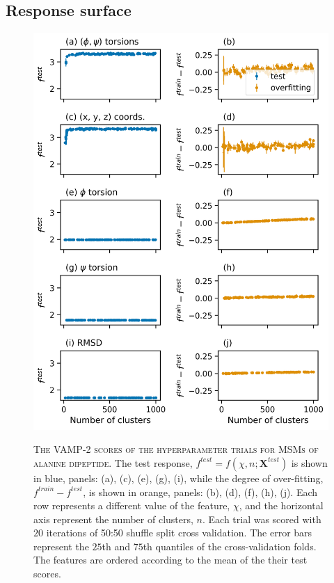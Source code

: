 \subsection{Response surface}\label{sec:ala_rsm}

\begin{figure}[p]
    \centering
    \caption[The VAMP-2 scores of the hyperparameter trials for MSMs of alanine dipeptide]{\textsc{The VAMP-2 scores of the hyperparameter trials for MSMs of alanine dipeptide}. The test response, $f^{test} = f(\chi, n; \mathbf{X}^{test})$ is shown in blue, panels: (a), (c), (e), (g), (i),  while the degree of over-fitting, $f^{train} - f^{test}$, is shown in orange, panels: (b), (d), (f), (h), (j). Each row represents a different value of the feature, $\chi$, and the horizontal axis represent the number of clusters, $n$. Each trial was scored with $20$ iterations of 50:50 shuffle split cross validation. The error bars represent the $25$th and $75$th quantiles of the cross-validation folds. 
    The features are ordered according to the mean of the their test scores.}
    \includegraphics[height=0.8\textheight]{chapters/msm_optimization/figures/ala1_train_test_results.png}
    \label{fig:ala1_train_test}
\end{figure}

